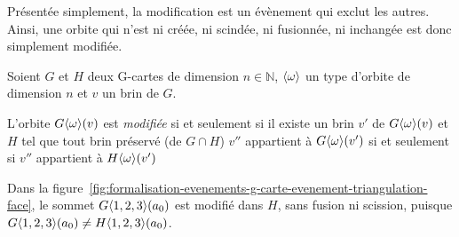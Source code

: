 Présentée simplement, la modification est un évènement qui exclut les autres. Ainsi, une orbite qui n'est ni créée, ni scindée, ni fusionnée, ni inchangée est donc simplement modifiée. %
\begin{definition}
	Soient $G$ et $H$ deux G-cartes de dimension $n \in \mathbb{N}$,
	$\langle\omega\rangle$ un type d'orbite de dimension $n$ et $v$ un brin de $G$. %

	L'orbite $G\langle\omega\rangle(v)$ est \emph{modifiée} si et seulement si il existe un brin $v'$ de
	$G\langle\omega\rangle(v)$ et $H$ tel que tout brin préservé (de $G \cap H$) $v''$ appartient à $G\langle\omega\rangle(v')$ si et seulement si $v''$ appartient à $H\langle\omega\rangle(v')$%
\end{definition}

Dans la
figure~\ref{fig:formalisation-evenements-g-carte-evenement-triangulation-face},
le sommet $G\langle1,2,3\rangle(a_{0})$ est modifié dans $H$, sans fusion ni scission, puisque
$G\langle1,2,3\rangle(a_{0}) \neq H\langle1,2,3\rangle(a_{0})$. %





